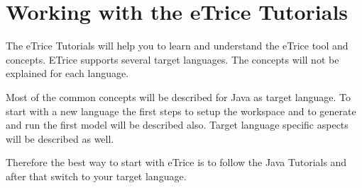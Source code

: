 \chapter{Working with the eTrice Tutorials}

The eTrice Tutorials will help you to learn and understand the eTrice tool and concepts. ETrice supports 
several target languages. The concepts will not be explained for each language. 

Most of the common concepts will be described for Java as target language. To start with a new language the 
first steps to setup the workspace and to generate and run the first model will be described also. Target 
language specific aspects will be described as well.

Therefore the best way to start with eTrice is to follow the Java Tutorials and after that switch to your 
target language.  
